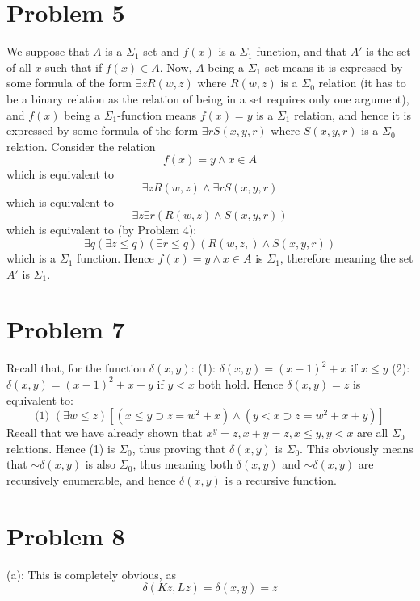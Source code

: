 \documentclass{article}
\newcommand*{\oldneg}{\mathord{\sim}}
\theoremstyle{definition}
\begin{document}
\section*{Problem 5}
We suppose that $A$ is a $\Sigma_1$ set and $f(x)$ is a $\Sigma_1$-function, and that $A'$ is the set of all $x$ such that if $f(x)\in A$. Now, 
$A$ being a $\Sigma_1$ set means it is expressed by some formula of the form $\exists zR\left(w,z\right)$ where 
$R\left(w,z\right)$ is a $\Sigma_0$ relation (it has to be a binary relation as the relation of being in a set requires only one argument), 
and $f(x)$ being a $\Sigma_1$-function means $f(x)=y$ is a $\Sigma_1$ relation, and hence it is 
expressed by some formula of the form $\exists rS\left(x,y,r\right)$ where $S\left(x,y,r\right)$ is a $\Sigma_0$ relation. Consider the 
relation \[ f(x)=y\wedge x\in A \] which is equivalent to \[ \exists zR\left(w,z\right)\wedge \exists rS\left(x,y,r\right) \] 
which is equivalent to \[ \exists z\exists r\left(R\left(w,z\right)\wedge S\left(x,y,r\right)\right) \] which is equivalent to (by Problem 4):
\[ \exists q\left(\exists z\le q\right)\left(\exists r\le q\right)\left(R\left(w,z,\right)\wedge S\left(x,y,r\right)\right) \]
which is a $\Sigma_1$ function. Hence $f(x)=y\wedge x\in A$ is $\Sigma_1$, therefore meaning the set $A'$ is $\Sigma_1$.

\section*{Problem 7}
Recall that, for the function $\delta\left(x,y\right)$:\newline
(1): $\delta\left(x,y\right)=\left(x-1\right)^2+x$ if $x\le y$\newline
(2): $\delta\left(x,y\right)=\left(x-1\right)^2+x+y$ if $y<x$\newline
both hold. Hence $\delta\left(x,y\right)=z$ is equivalent to:
\[ \textrm{(1) }\left(\exists w\le z\right)[\left(x\le y\supset z=w^2+x\right)\wedge\left(y<x\supset z=w^2+x+y\right)] \]
Recall that we have already shown that $x^y=z,x+y=z,x\le y,y<x$ are all $\Sigma_0$ relations. Hence (1) is $\Sigma_0$, thus proving that 
$\delta\left(x,y\right)$ is $\Sigma_0$. This obviously means that $\oldneg\delta\left(x,y\right)$ is also $\Sigma_0$, thus meaning both 
$\delta\left(x,y\right)$ and $\oldneg\delta\left(x,y\right)$ are recursively enumerable, and hence $\delta\left(x,y\right)$ is a recursive function.

\section*{Problem 8}
(a): This is completely obvious, as
\[ \delta\left(Kz,Lz\right)=\delta\left(x,y\right)=z \]
\end{document}
